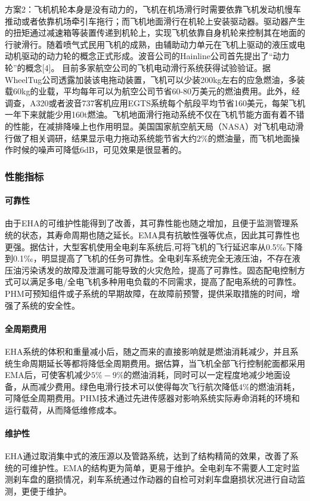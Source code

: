 \documentclass[12pt,a4paper]{report}
\begin{document}
方案2：飞机机轮本身是没有动力的，飞机在机场滑行时需要依靠飞机发动机慢车推动或者依靠机场牵引车拖行；而飞机地面滑行在机轮上安装驱动器。驱动器产生的扭矩通过减速箱等装置传递到机轮上，实现飞机依靠自身机轮来控制其在地面的行驶滑行。随着喷气式民用飞机的成熟，由辅助动力单元在飞机上驱动的液压或电动机驱动的动力轮的概念正式形成。波音公司的Hainline公司首先提出了“动力轮”的概念[4]。
目前多家航空公司的飞机电动滑行系统获得试验验证。据WheelTug公司透露加装该电拖动装置，飞机可以少装200kg左右的应急燃油，多装载60kg的业载，平均每年可以为航空公司节省60-80万美元的燃油费用。此外，经调查，A320或者波音737客机应用EGTS系统每个航段平均节省160美元，每架飞机一年下来就能少用160t燃油。飞机地面滑行拖动系统不仅在飞机节能方面有着不错的性能，在减排降噪上也作用明显。美国国家航空航天局（NASA）对飞机电动滑行做了相关调研，结果显示电力拖动系统能节省大约$2\%$的燃油量，而飞机地面操作时候的噪声可降低6dB，可见效果是很显著的。

\subsubsection{性能指标}
\paragraph{可靠性}
由于EHA的可维护性能得到了改善，其可靠性能也随之增加，且便于监测管理系统的状态，其寿命周期也随之延长。EMA具有抗敏性强等优点，因此其可靠性也更强。据估计，大型客机使用全电刹车系统后,可将飞机的飞行延迟率从0.5‰下降到0.1‰，明显提高了飞机的任务可靠性。全电刹车系统完全无液压油，不存在液压油污染诱发的故障及泄漏可能导致的火灾危险，提高了可靠性。固态配电控制方式可以满足多电/全电飞机多种用电负载的不同需求，提高了配电系统的可靠性。PHM可预知组件或子系统的早期故障，在故障前预警，提供采取措施的时间，增强了系统的安全性。

\paragraph{全周期费用}
EHA系统的体积和重量减小后，随之而来的直接影响就是燃油消耗减少，并且系统生命周期延长等都将降低全周期费用。据估算，当飞机全部飞行控制舵面都采用EMA后，可使客机减少$5\%-9\%$的燃油消耗，同时可以一定程度地减少地面设备，从而减少费用。绿色电滑行技术可以使得每次飞行航次降低$4\%$的燃油消耗，可降低全周期费用。PHM技术通过先进传感器对影响系统实际寿命消耗的环境和运行载荷，从而降低维修成本。

\paragraph{维护性}
EHA通过取消集中式的液压源以及管路系统，达到了结构精简的效果，改善了系统的可维护性。EMA的结构更为简单，更易于维护。全电刹车不需要人工定时监测刹车盘的磨损情况，刹车系统通过作动器的自检可对刹车盘磨损状况进行自动监测，更便于维护。
\end{document}
